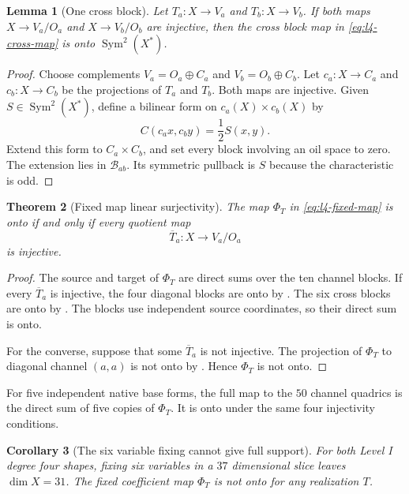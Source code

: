 \documentclass[11pt]{article}
\newcommand{\Sym}{\operatorname{Sym}}
\theoremstyle{plain}
\newtheorem{theorem}{Theorem}[section]
\newtheorem{lemma}[theorem]{Lemma}
\newtheorem{corollary}[theorem]{Corollary}
\theoremstyle{definition}
\theoremstyle{remark}
\begin{document}
\begin{lemma}[One cross block]
\label{lem:l4-fixed-cross}
Let $T_a:X\to V_a$ and $T_b:X\to V_b$.  If both maps
$X\to V_a/O_a$ and $X\to V_b/O_b$ are injective, then the cross block map
in \eqref{eq:l4-cross-map} is onto $\Sym^2(X^*)$.
\end{lemma}

\begin{proof}
Choose complements $V_a=O_a\oplus C_a$ and
$V_b=O_b\oplus C_b$.  Let $c_a:X\to C_a$ and $c_b:X\to C_b$ be the
projections of $T_a$ and $T_b$.  Both maps are injective.  Given
$S\in\Sym^2(X^*)$, define a bilinear form on
$c_a(X)\times c_b(X)$ by
\[
 C(c_a x,c_b y)=\frac{1}{2}S(x,y).
\]
Extend this form to $C_a\times C_b$, and set every block involving an oil
space to zero.  The extension lies in $\mathcal B_{ab}$.  Its symmetric
pullback is $S$ because the characteristic is odd.
\end{proof}

\begin{theorem}[Fixed map linear surjectivity]
\label{thm:l4-fixed-surjectivity}
The map $\Phi_T$ in \eqref{eq:l4-fixed-map} is onto if and only if every
quotient map
\[
  \overline T_a:X\longrightarrow V_a/O_a
\]
is injective.
\end{theorem}

\begin{proof}
The source and target of $\Phi_T$ are direct sums over the ten channel
blocks.  If every $\overline T_a$ is injective, the four diagonal blocks are
onto by .  The six cross blocks are onto by
.  The blocks use independent source coordinates,
so their direct sum is onto.

For the converse, suppose that some $\overline T_a$ is not injective.  The
projection of $\Phi_T$ to diagonal channel $(a,a)$ is not onto by
.  Hence $\Phi_T$ is not onto.
\end{proof}

For five independent native base forms, the full map to the $50$ channel
quadrics is the direct sum of five copies of $\Phi_T$.  It is onto under the
same four injectivity conditions.

\begin{corollary}[The six variable fixing cannot give full support]
\label{cor:l4-six-fixing-obstruction}
For both Level I degree four shapes, fixing six variables in a
$37$ dimensional slice leaves $\dim X=31$.  The fixed coefficient map
$\Phi_T$ is not onto for any realization $T$.
\end{corollary}
\end{document}
